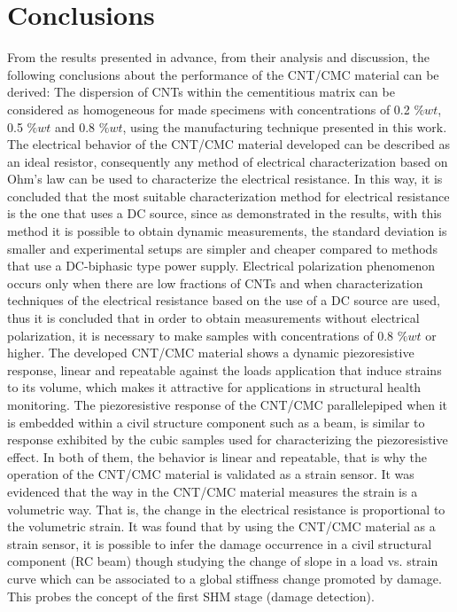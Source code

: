 \documentclass[twocolumn]{bmcart}%
\begin{document}
\section*{Conclusions}

From the results presented in advance, from their analysis and discussion, the following conclusions about the performance of the CNT/CMC material can be derived:
The dispersion of CNTs within the cementitious matrix can be considered as homogeneous for made specimens with concentrations of 0.2 $\%wt$, 0.5 $\%wt$ and 0.8 $\%wt$, using the manufacturing technique presented in this work.
The electrical behavior of the CNT/CMC material developed can be described as an ideal resistor, consequently any method of electrical characterization based on Ohm's law can be used to characterize the electrical resistance. In this way, it is concluded that the most suitable characterization method for electrical resistance is the one that uses a DC source, since as demonstrated in the results, with this method it is possible to obtain dynamic measurements, the standard deviation is smaller and experimental setups are simpler and cheaper compared to methods that use a DC-biphasic type power supply.
Electrical polarization phenomenon occurs only when there are low fractions of CNTs and when characterization techniques of the electrical resistance based on the use of a DC source are used, thus it is concluded that in order to obtain measurements without electrical polarization, it is necessary to make samples with concentrations of 0.8 $\%wt$ or higher.
The developed CNT/CMC material shows a dynamic piezoresistive response, linear and repeatable against the loads application that induce strains to its volume, which makes it attractive for applications in structural health monitoring.
The piezoresistive response of the CNT/CMC parallelepiped when it is embedded within a civil structure component such as a beam, is similar to response exhibited by the cubic samples used for characterizing the piezoresistive effect.  In both of them, the behavior is linear and repeatable, that is why the operation of the CNT/CMC material is validated as a strain sensor.
It was evidenced that the way in the CNT/CMC material measures the strain is a volumetric way. That is, the change in the electrical resistance is proportional to the volumetric strain.
It was found that by using the CNT/CMC material as a strain sensor, it is possible to infer the damage occurrence in a civil structural component (RC beam) though studying the change of slope in a load vs. strain curve which can be associated to a global stiffness change promoted by damage. This probes the concept of the first SHM stage (damage detection).
\end{document}
